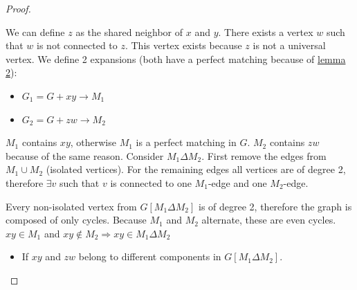 \documentclass[notitlepage, 12pt]{article}
\begin{document}
\begin{proof}
\begin{itemize}
\begin{enumerate}
\begin{center}
      \end{center}
      
      We can define $z$ as the shared neighbor of $x$ and $y$. There exists a vertex $w$ such
      that $w$ is not connected to $z$. This vertex exists because $z$ is not a universal vertex.
      We define 2 expansions (both have a perfect matching because of \hyperref[proof-lemma:2]{lemma 2}):
      \begin{itemize}
        \item $G_1 = G + xy \rightarrow M_1$
        \item $G_2 = G + zw \rightarrow M_2$
      \end{itemize}
      $M_1$ contains $xy$, otherwise $M_1$ is a perfect matching in $G$. $M_2$ contains $zw$ because of the same reason.
      Consider $M_1 \Delta M_2$. First remove the edges from $M_1 \cup M_2$ (isolated vertices).
      For the remaining edges all vertices are of degree 2, therefore $\exists v$ such that $v$ is connected to
      one $M_1$-edge and one $M_2$-edge.

      Every non-isolated vertex from $G[M_1 \Delta M_2]$ is of degree 2, therefore the graph is
      composed of only cycles. Because $M_1$ and $M_2$ alternate, these are even cycles.
      $xy \in M_1$ and $xy \notin M_2 \Rightarrow xy \in M_1 \Delta M_2$
      \begin{itemize}
        \item If $xy$ and $zw$ belong to different components in $G[M_1 \Delta M_2]$.
        

\end{itemize}
\end{enumerate}
\end{itemize}
\end{proof}
\end{document}
